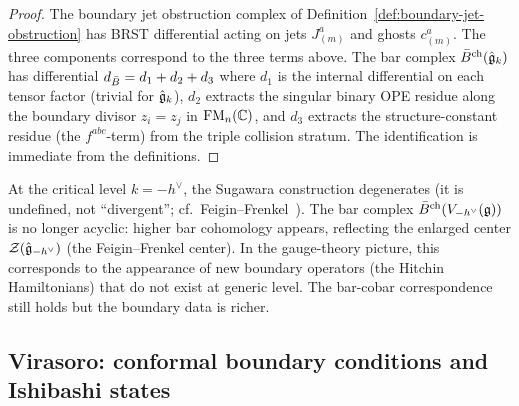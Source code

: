 \begin{proof}
The boundary jet obstruction complex of
Definition~\ref*{def:boundary-jet-obstruction} has BRST differential
acting on jets $J^a_{(m)}$ and ghosts $c^a_{(m)}$. The three
components correspond to the three terms above. The bar complex
$\bar{B}^{\mathrm{ch}}(\hat{\mathfrak{g}}_k)$ has differential $d_{\bar{B}} = d_1 + d_2 + d_3$
where $d_1$ is the internal differential on each tensor factor
(trivial for $\hat{\mathfrak{g}}_k$), $d_2$ extracts the singular binary OPE
residue along the boundary divisor $z_i = z_j$ in $\operatorname{FM}_n(\mathbb{C})$, and
$d_3$ extracts the structure-constant residue (the $f^{abc}$-term)
from the triple collision stratum. The identification is immediate
from the definitions.
\end{proof}

\begin{remark}
At the critical level $k = -h^\vee$, the Sugawara construction
degenerates (it is undefined, not ``divergent''; cf.\
Feigin--Frenkel~\cite{FF}). The bar complex $\bar{B}^{\mathrm{ch}}(V_{-h^\vee}(\mathfrak{g}))$
is no longer acyclic: higher bar cohomology appears, reflecting the
enlarged center $\mathcal{Z}(\hat{\mathfrak{g}}_{-h^\vee})$ (the Feigin--Frenkel center).
In the gauge-theory picture, this corresponds to the appearance of new
boundary operators (the Hitchin Hamiltonians) that do not exist at
generic level. The bar-cobar correspondence still holds but the
boundary data is richer.
\end{remark}

\subsection{Virasoro: conformal boundary conditions and Ishibashi states}

